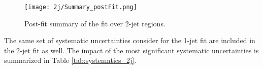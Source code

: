 \begin{figure}[H]
    \center
    \texttt{[image: 2j/Summary\_postFit.png]}
    \caption{Post-fit summary of the fit over 2-jet regions.}
    \label{fig:fit_results_2j}
\end{figure}


The same set of systematic uncertainties consider for the 1-jet fit are included in the 2-jet fit as well. The impact of the most significant systematic uncertainties is summarized in Table \ref{tab:systematics_2j}. 

